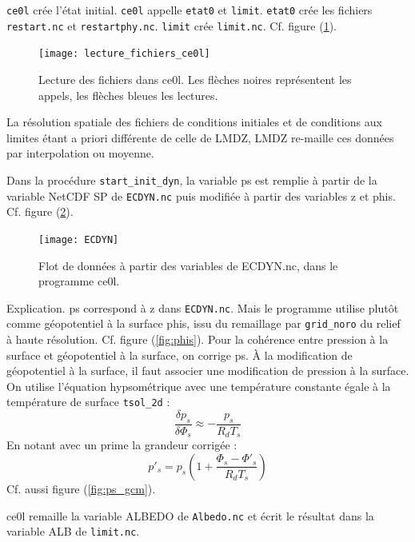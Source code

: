 \documentclass[a4paper,english,french]{article}
\begin{document}
\verb+ce0l+ crée l'état initial. \verb+ce0l+ appelle
\verb+etat0+ et \verb+limit+. \verb+etat0+ crée les fichiers
\verb+restart.nc+ et \verb+restartphy.nc+. \verb+limit+ crée
\verb+limit.nc+. Cf. figure (\ref{fig:lecture_fichiers_ce0l}).
\begin{figure}
  \centering
  \texttt{[image: lecture\_fichiers\_ce0l]}
  \caption[Lecture des fichiers dans ce0l]{Lecture des fichiers dans
    ce0l. Les flèches noires représentent les appels, les flèches
    bleues les lectures.}
  \label{fig:lecture_fichiers_ce0l}
\end{figure}

La résolution spatiale des fichiers de conditions initiales et de
conditions aux limites étant a priori différente de celle de LMDZ,
LMDZ re-maille ces données par interpolation ou moyenne.

Dans la procédure \verb+start_init_dyn+, la variable ps est remplie à
partir de la variable NetCDF SP de \verb+ECDYN.nc+ puis modifiée à
partir des variables z et phis. Cf. figure (\ref{fig:ECDYN}).
\begin{figure}
  \centering
  \texttt{[image: ECDYN]}
  \caption[Flot de données : ECDYN.nc dans ce0l]{Flot de données à
    partir des variables de ECDYN.nc, dans le programme ce0l.}
  \label{fig:ECDYN}
\end{figure}
Explication. ps correspond à z dans \verb+ECDYN.nc+. Mais le programme
utilise plutôt comme géopotentiel à la surface phis, issu du
remaillage par \verb+grid_noro+ du relief à haute
résolution. Cf. figure (\ref{fig:phis}). Pour la cohérence entre
pression à la surface et géopotentiel à la surface, on corrige ps. \`A
la modification de géopotentiel à la surface, il faut associer une
modification de pression à la surface. On utilise l'équation
hypsométrique avec une température constante égale à la température de
surface \verb+tsol_2d+ :
\begin{equation*}
  \frac{\delta p_s}{\delta \Phi_s} \approx - \frac{p_s}{R_d T_s}
\end{equation*}
En notant avec un prime la grandeur corrigée :
\begin{equation*}
  p'_s = p_s \left(1 + \frac{\Phi_s - \Phi'_s}{R_d T_s} \right)
\end{equation*}
Cf. aussi figure (\ref{fig:ps_gcm}).

ce0l remaille la variable ALBEDO de \verb+Albedo.nc+ et écrit le
résultat dans la variable ALB de \verb+limit.nc+.
\end{document}
